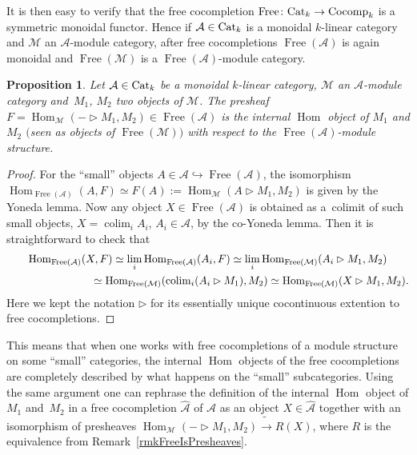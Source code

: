 \documentclass[pdftex]{sigma}%
\numberwithin{equation}{section}
\newtheorem{Proposition}[Theorem]{Proposition}
 { \theoremstyle{definition}
\newtheorem{Definition}[Theorem]{Definition}
\newtheorem{Note}[Theorem]{Note}
\newtheorem{Example}[Theorem]{Example}
\newtheorem{Remark}[Theorem]{Remark} }
\newcommand{\Free}{\operatorname{Free}}
\newcommand{\colim}{\operatorname{colim}}
\newcommand{\Hom}{\operatorname{Hom}}
\begin{document}
It is then easy to verify that the free cocompletion $\Free\colon {\rm Cat}_k \to {\rm Cocomp}_k$ is a symmetric monoidal functor. Hence if $\mathcal{A} \in {\rm Cat}_k$ is a monoidal $k$-linear category and $\mathcal{M}$ an $\mathcal{A}$-module category, after free cocompletions $\Free(\mathcal{A})$ is again monoidal and $\Free(\mathcal{M})$ is a $\Free(\mathcal{A})$-module category.

\begin{Proposition}\label{propIntHomFree}
Let $\mathcal{A} \in {\rm Cat}_k$ be a monoidal $k$-linear category, $\mathcal{M}$ an $\mathcal{A}$-module category and~$M_1$, $M_2$ two objects of $\mathcal{M}$. The presheaf $F= \Hom_\mathcal{M}(-\rhd M_1,M_2) \in \Free(\mathcal{A})$ is the internal $\Hom$ object of $M_1$ and $M_2$ $($seen as objects of $\Free(\mathcal{M}))$ with respect to the $\Free(\mathcal{A})$-module structure.
\end{Proposition}

\begin{proof}
For the ``small'' objects $A \in \mathcal{A} \hookrightarrow \Free(\mathcal{A})$, the isomorphism $\Hom_{\Free(\mathcal{A})}(A,F)\simeq F(A) := \Hom_{\mathcal{M}}(A\rhd M_1,M_2)$ is given by the Yoneda lemma.
Now any object $X\in\Free(\mathcal{A})$ is obtained as a~colimit of such small objects, $X = \colim_i A_i$, $A_i \in \mathcal{A}$, by the co-Yoneda lemma. Then it is straight\-forward to check that
\begin{gather*}
\Hom_{\Free(\mathcal{A})}(X,F) \simeq \lim_i \Hom_{\Free(\mathcal{A})}(A_i,F) \simeq \lim_i \Hom_{\Free(\mathcal{M})}(A_i \rhd M_1,M_2)
\\ \hphantom{\Hom_{\Free(\mathcal{A})}(X,F)}
{}\simeq \Hom_{\Free(\mathcal{M})}(\colim_i (A_i \rhd M_1),M_2) \simeq \Hom_{\Free(\mathcal{M})}(X \rhd M_1,M_2).
\end{gather*}
Here we kept the notation $\rhd$ for its essentially unique cocontinuous extention to free cocompletions.
\end{proof}

This means that when one works with free cocompletions of a module structure on some ``small'' categories, the internal $\Hom$ objects of the free cocompletions are completely described by what happens on the ``small'' subcategories.
Using the same argument one can rephrase the definition of the internal $\Hom$ object of $M_1$ and~$M_2$ in a free cocompletion $\hat{\mathcal{A}}$ of $\mathcal{A}$ as an object $X\in \hat{\mathcal{A}}$ together with an isomorphism of presheaves $\Hom_\mathcal{M}(-\rhd M_1,M_2) \tilde{\to} R(X)$, where $R$ is the equivalence from Remark~\ref{rmkFreeIsPresheaves}.
\end{document}
